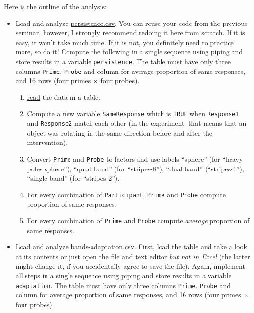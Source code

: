 \documentclass[
]{book}
\providecommand{\tightlist}{%
  \setlength{\itemsep}{0pt}\setlength{\parskip}{0pt}}
\begin{document}
Here is the outline of the analysis:

\begin{itemize}
\tightlist
\item
  Load and analyze \href{data/persistence.csv}{persistence.csv}. You can reuse your code from the previous seminar, however, I strongly recommend redoing it here from scratch. If it is easy, it won't take much time. If it is not, you definitely need to practice more, so do it! Compute the following in a single sequence using piping and store results in a variable \texttt{persistence}. The table must have only three columns \texttt{Prime}, \texttt{Probe} and column for average proportion of same responses, and 16 rows (four primes × four probes).

  \begin{enumerate}
  \def\labelenumi{\arabic{enumi}.}
  \tightlist
  \item
    \protect\hyperlink{readr}{read} the data in a table.
  \item
    Compute a new variable \texttt{SameResponse} which is \texttt{TRUE} when \texttt{Response1} and \texttt{Response2} match each other (in the experiment, that means that an object was rotating in the same direction before and after the intervention).
  \item
    Convert \texttt{Prime} and \texttt{Probe} to factors and use labels ``sphere'' (for ``heavy poles sphere''), ``quad band'' (for ``stripes-8''), ``dual band'' (``stripes-4''), ``single band'' (for ``stripes-2'').
  \item
    For every combination of \texttt{Participant}, \texttt{Prime} and \texttt{Probe} compute proportion of same responses.
  \item
    For every combination of \texttt{Prime} and \texttt{Probe} compute \emph{average} proportion of same responses.
  \end{enumerate}
\item
  Load and analyze \href{data/bands-adaptation.csv}{bands-adaptation.csv}. First, load the table and take a look at its contents or just open the file and text editor \emph{but not in Excel} (the latter might change it, if you accidentally agree to save the file). Again, implement all steps in a single sequence using piping and store results in a variable \texttt{adaptation}. The table must have only three columns \texttt{Prime}, \texttt{Probe} and column for average proportion of same responses, and 16 rows (four primes × four probes).


\end{itemize}
\end{document}
